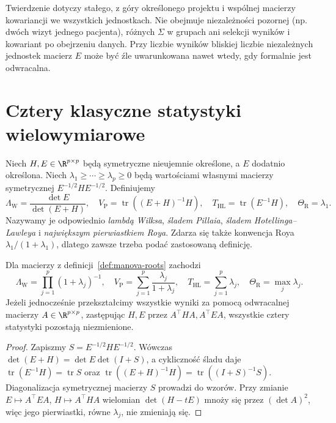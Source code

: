 \begin{uwaga}
Twierdzenie dotyczy stałego, z góry określonego projektu i wspólnej macierzy kowariancji we wszystkich jednostkach. Nie obejmuje niezależności pozornej (np. dwóch wizyt jednego pacjenta), różnych $\Sigma$ w grupach ani selekcji wyników i kowariant po obejrzeniu danych. Przy liczbie wyników bliskiej liczbie niezależnych jednostek macierz $E$ może być źle uwarunkowana nawet wtedy, gdy formalnie jest odwracalna.
\end{uwaga}

\section{Cztery klasyczne statystyki wielowymiarowe}
\begin{definicja}\label{def:manova-roots}
Niech $H,E\in\R^{p\times p}$ będą symetryczne nieujemnie określone, a $E$ dodatnio określona. Niech $\lambda_1\ge\cdots\ge\lambda_p\ge0$ będą wartościami własnymi macierzy symetrycznej $E^{-1/2}HE^{-1/2}$. Definiujemy
\[
 \Lambda_{\mathrm W}=\frac{\det E}{\det(E+H)},\quad
 V_{\mathrm P}=\operatorname{tr}((E+H)^{-1}H),\quad
 T_{\mathrm{HL}}=\operatorname{tr}(E^{-1}H),\quad
 \Theta_{\mathrm R}=\lambda_1.
\]
Nazywamy je odpowiednio \emph{lambdą Wilksa}, \emph{śladem Pillaia}, \emph{śladem Hotellinga--Lawleya} i \emph{największym pierwiastkiem Roya}. Zdarza się także konwencja Roya $\lambda_1/(1+\lambda_1)$, dlatego zawsze trzeba podać zastosowaną definicję.
\end{definicja}

\begin{twierdzenie}\label{thm:manova-spectra}
Dla macierzy z definicji~\ref{def:manova-roots} zachodzi
\[
 \Lambda_{\mathrm W}=\prod_{j=1}^p(1+\lambda_j)^{-1},\quad
 V_{\mathrm P}=\sum_{j=1}^p\frac{\lambda_j}{1+\lambda_j},\quad
 T_{\mathrm{HL}}=\sum_{j=1}^p\lambda_j,\quad \Theta_{\mathrm R}=\max_j\lambda_j.
\]
Jeżeli jednocześnie przekształcimy wszystkie wyniki za pomocą odwracalnej macierzy $A\in\R^{p\times p}$, zastępując $H,E$ przez $A^\top HA,A^\top EA$, wszystkie cztery statystyki pozostają niezmienione.
\end{twierdzenie}
\begin{proof}
Zapiszmy $S=E^{-1/2}HE^{-1/2}$. Wówczas $\det(E+H)=\det E\det(I+S)$, a cykliczność śladu daje $\operatorname{tr}(E^{-1}H)=\operatorname{tr}S$ oraz $\operatorname{tr}((E+H)^{-1}H)=\operatorname{tr}((I+S)^{-1}S)$. Diagonalizacja symetrycznej macierzy $S$ prowadzi do wzorów. Przy zmianie $E\mapsto A^\top EA$, $H\mapsto A^\top HA$ wielomian $\det(H-tE)$ mnoży się przez $(\det A)^2$, więc jego pierwiastki, równe $\lambda_j$, nie zmieniają się.
\end{proof}

